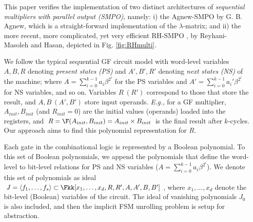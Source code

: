 This paper verifies the implementation of two distinct 
architectures of {\it sequential multipliers with parallel output
  (SMPO)}, namely: i) the Agnew-SMPO  \cite{agnew1991implementation}
by G. B. Agnew, which is a straight-forward implementation of the
$\lambda$-matrix; and ii) the more recent, more complicated, yet very
efficient RH-SMPO \cite{RHmulti}, by Reyhani-Masoleh and Hasan,
depicted in Fig. \ref{fig:RHmulti}.  

\begin{figure}[hbt]
\end{figure}

We follow  the typical sequential GF circuit model with word-level variables $A, B, R$
denoting {\it present states (PS)} and $A', B', R'$ denoting {\it next
  states (NS)} of the machine; where $A = \sum_{i=0}^{k-1} a_i \beta^{2^i}$
for the PS variables and $A' = \sum_{i=0}^{k-1} a_i'
\beta^{2^i}$ for NS variables, and so on.  Variables $R\ (R')$ correspond to those that 
store the result, and $A, B\ (A', B')$ store input operands. {\it E.g.,}
for a GF multiplier, $A_{init}, B_{init}$ (and $R_{init} =
0$) are the initial values (operands) loaded into the registers,  and
$R = \F(A_{init}, B_{init}) = A_{init} \times B_{init}$ is the final
result after $k$-cycles. Our approach aims to find this polynomial
representation for $R$.  

Each gate in the combinational logic is represented by a Boolean
polynomial. To 
this set of Boolean polynomials, we append the polynomials that define
the word-level to bit-level relations for PS and NS variables ($A =
\sum_{i=0}^{k-1} a_i \beta^{2^i}$). We denote this set of polynomials
as ideal $J = \langle 
f_1, \dots, f_s \rangle \subset \Fkk[x_1, \dots, x_d, R, R', A, A', B,
  B']$, where $x_1, \dots, x_d$ denote the bit-level (Boolean) variables
  of the circuit. The ideal of vanishing polynomials $J_0$ is also included, and
then the implicit FSM unrolling problem is setup for abstraction. 

